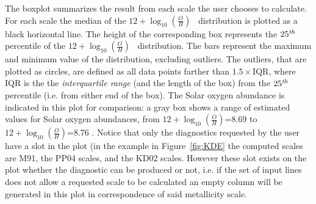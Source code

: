 \documentclass{emulateapj}
\newcommand{\oxab}{\ensuremath{12 + \log_{10}(\frac{O}{H})}}
\begin{document}
The boxplot summarizes the result from each scale the user chooses to calculate. For each scale the median of the \oxab~ distribution is plotted as a black horizontal line. The height of the corresponding box represents the $25^\mathrm{\emph{th}}$ percentile of the \oxab~ distribution. 
The bars represent the maximum and minimum value of the distribution, excluding outliers. The outliers, that are plotted as circles, are defined as all data points farther than  $1.5\times\mathrm{IQR}$, where IQR is the the \emph{interquartile range} (and the length of the box) from the $25^\mathrm{\emph{th}}$ percentile (i.e. from either end of the box). 
The Solar oxygen abundance is indicated in this plot for comparison: a gray box shows a range of estimated values for Solar oxygen abundances, from \oxab=8.69 \citep{asplund09_rev} to \oxab=8.76 \citep{chaffau11}.
Notice that only the diagnostics requested by the user have a slot in the plot (in the example in Figure~\ref{fig:KDE} the computed scales are M91, the PP04 scales, and the KD02 scales. However these slot exists on the plot whether the diagnostic can be produced or not, i.e. if the set of input lines does not allow a requested scale to be calculated an empty column will be generated in this plot in correspondence of said metallicity scale.


\end{document}
